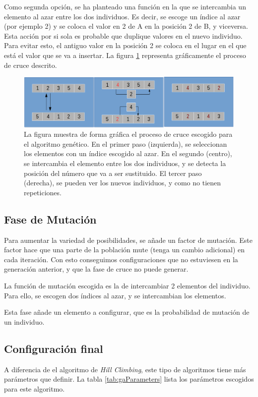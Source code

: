\documentclass[10pt,a4paper]{article}
\begin{document}
Como segunda opción, se ha planteado una función en la que se intercambia un elemento al azar entre los dos individuos. Es decir, se escoge un índice al azar (por ejemplo 2) y se coloca el valor en 2 de A en la posición 2 de B, y viceversa. Esta acción por si sola es probable que duplique valores en el nuevo individuo. Para evitar esto, el antiguo valor en la posición 2 se coloca en el lugar en el que está el valor que se va a insertar. La figura \ref{fig:gaCrossover} representa gráficamente el proceso de cruce descrito.

\begin{figure}[h]
\includegraphics[scale=0.45]{gaCrossover.png} 
\caption{La figura muestra de forma gráfica el proceso de cruce escogido para el algoritmo genético. En el primer paso (izquierda), se seleccionan los elementos con un índice escogido al azar. En el segundo (centro), se intercambia el elemento entre los dos individuos, y se detecta la posición del número que va a ser sustituido. El tercer paso (derecha), se pueden ver los nuevos individuos, y como no tienen repeticiones.}
\label{fig:gaCrossover}
\end{figure}

\subsection{Fase de Mutación}
Para aumentar la variedad de posibilidades, se añade un factor de mutación. Este factor hace que una parte de la población mute (tenga un cambio adicional) en cada iteración. Con esto conseguimos configuraciones que no estuviesen en la generación anterior, y que la fase de cruce no puede generar.

La función de mutación escogida es la de intercambiar 2 elementos del individuo. Para ello, se escogen dos índices al azar, y se intercambian los elementos.

Esta fase añade un elemento a configurar, que es la probabilidad de mutación de un individuo.

\subsection{Configuración final}
A diferencia de el algoritmo de \textit{Hill Climbing}, este tipo de algoritmos tiene más parámetros que definir. La tabla \ref{tab:gaParameters} lista los parámetros escogidos para este algoritmo.
\end{document}
